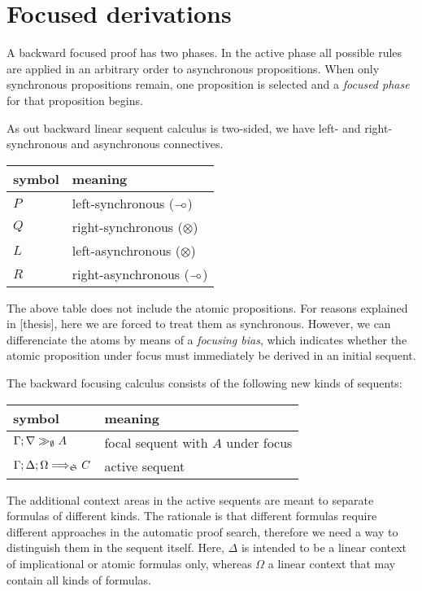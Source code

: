 \section{Focused derivations}

A backward focused proof has two phases. In the active phase all possible rules
are applied in an arbitrary order to asynchronous propositions. When only
synchronous propositions remain, one proposition is selected and a \emph{focused
  phase} for that proposition begins.

As out backward linear sequent calculus is two-sided, we have left- and right-
synchronous and asynchronous connectives.

\begin{table}[h]
  \centering
  \begin{tabular}{|l|l|}
    \hline
    \textbf{symbol} & \textbf{meaning} \\
    \hline
    $P$ & left-synchronous ($\mathbin{{-}\mkern-3.5mu{\circ}}$) \\
    $Q$ & right-synchronous ($\otimes$) \\
    $L$ & left-asynchronous ($\otimes$) \\
    $R$ & right-asynchronous ($\mathbin{{-}\mkern-3.5mu{\circ}}$) \\
    \hline
  \end{tabular}
\end{table}

The above table does not include the atomic propositions. For reasons explained
in [thesis], here we are forced to treat them as synchronous. However, we can
differenciate the atoms by means of a \emph{focusing bias}, which indicates
whether the atomic proposition under focus must immediately be derived in an
initial sequent.

The backward focusing calculus consists of the following new kinds of sequents:

\begin{table}[h]
  \centering
  \begin{tabular}{|l|l|}
    \hline
    \textbf{symbol} & \textbf{meaning} \\
    \hline
    $\Gamma; \nabla \gg_{\emptyset} A$ & focal sequent with $A$ under focus \\
    $\Gamma; \Delta; \Omega \Longrightarrow_{\mathfrak{S}_{}} C$ & active sequent \\
    \hline
  \end{tabular}
\end{table}

The additional context areas in the active sequents are meant to separate
formulas of different kinds. The rationale is that different formulas require
different approaches in the automatic proof search, therefore we need a way to
distinguish them in the sequent itself. Here, $\Delta$ is intended to be a
linear context of implicational or atomic formulas only, whereas $\Omega$ a
linear context that may contain all kinds of formulas.

